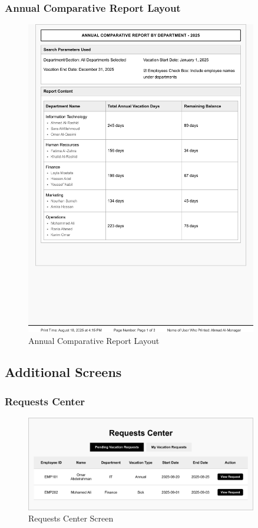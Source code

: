 \documentclass[12pt,a4paper]{article}
\begin{document}
\subsubsection{Annual Comparative Report Layout}
\begin{figure}[H]
\centering
\includegraphics[width=0.9\textwidth]{Wireframes/Print-Layout-Annual-Comparative-Report/Print-Layout-Annual-Comparative-Report-Web-1.png}
\caption{Annual Comparative Report Layout}
\label{fig:annual-comparative-report-layout}
\end{figure}

\subsection{Additional Screens}

\subsubsection{Requests Center}
\begin{figure}[H]
\centering
\includegraphics[width=0.9\textwidth]{Wireframes/Requests-Center/Requests-Center-1.png}
\caption{Requests Center Screen}
\label{fig:requests-center-screen}
\end{figure}
\end{document}
